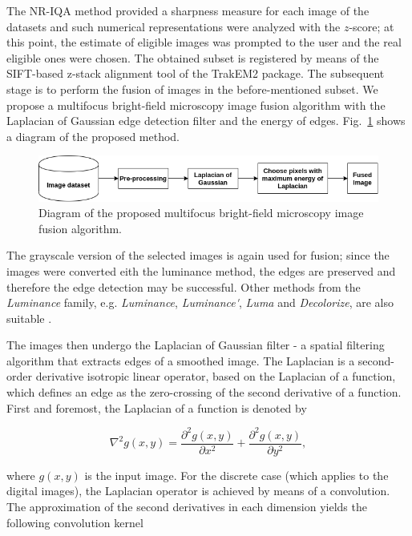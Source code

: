 The NR-IQA method provided a sharpness measure for each image of the datasets and such numerical representations were analyzed with the $z$-score; at this point, the estimate of eligible images was prompted to the user and the real eligible ones were chosen. The obtained subset is registered by means of the SIFT-based z-stack alignment tool of the TrakEM2 package. The subsequent stage is to perform the fusion of images in the before-mentioned subset. We propose a multifocus bright-field microscopy image fusion algorithm with the Laplacian of Gaussian edge detection filter and the energy of edges. Fig.~\ref{fig:fusion_pipeline} shows a diagram of the proposed method.

\begin{figure}[ht]
    \centering
    \caption{Diagram of the proposed multifocus bright-field microscopy image fusion algorithm.}
    \label{fig:fusion_pipeline}
    \includegraphics[scale=0.65]{images/fusion_pipeline.png}
    \centering
    \fautor
\end{figure}

The grayscale version of the selected images is again used for fusion; since the images were converted eith the luminance method, the edges are preserved and therefore the edge detection may be successful. Other methods from the \emph{Luminance} family, e.g. \emph{Luminance}, \emph{Luminance\'}, \emph{Luma} and \emph{Decolorize}, are also suitable \cite{kanan2012color}.

The images then undergo the Laplacian of Gaussian filter - a spatial filtering algorithm that extracts edges of a smoothed image. The Laplacian is a second-order derivative isotropic linear operator, based on the Laplacian of a function, which defines an edge as the zero-crossing of the second derivative of a function. First and foremost, the Laplacian of a function is denoted by

\begin{equation}
\label{eqn:laplacian_of_function}
\nabla^{2}g(x,y) = \frac{\partial^{2} g(x,y)}{\partial x^{2}}
                    +
                  \frac{\partial^{2} g(x,y)}{\partial y^{2}},
\end{equation}

\noindent where $g(x,y)$ is the input image. For the discrete case (which applies to the digital images), the Laplacian operator is achieved by means of a convolution. The approximation of the second derivatives in each dimension yields the following convolution kernel

